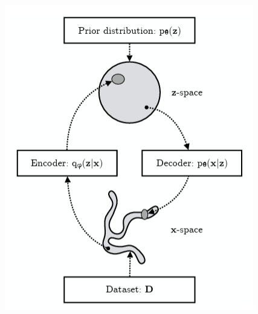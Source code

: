 \documentclass{amsart}
\begin{document}
\begin{figure}[h]
    \includegraphics[width=0.8\linewidth]{images/ELBO-1.PNG}
\end{figure}

\clearpage





\end{document}

